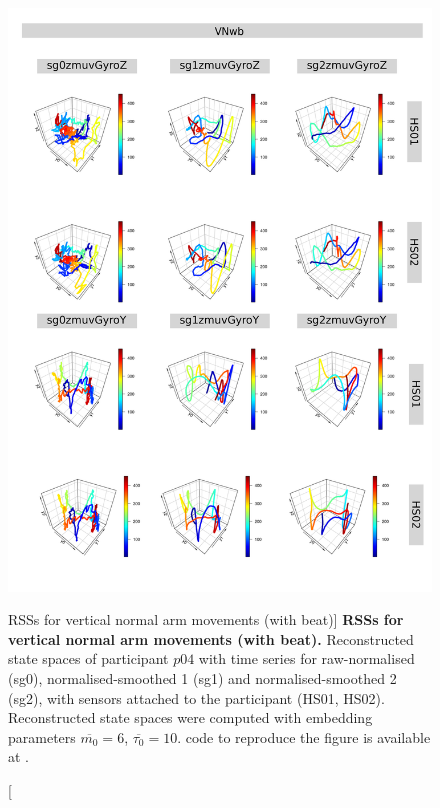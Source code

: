 \begin{figure}
\centering
\includegraphics[height=0.8\textheight]{rss_VNwb_p04}
\caption
	[RSSs for vertical normal arm movements (with beat)]{
	{\bf RSSs for vertical normal arm movements (with beat).}
	Reconstructed state spaces of participant $p04$
	with time series for raw-normalised (sg0), 
	normalised-smoothed 1 (sg1) and 
	normalised-smoothed 2 (sg2), 
	with sensors attached to the participant (HS01, HS02).
	Reconstructed state spaces were computed with 
	embedding parameters $\overline{m_0}=6$, $\overline{\tau_0}=10$.
		\R code to reproduce the figure is available at 
		.
        }
     \label{fig:rss_VNwb_p04}
\end{figure}






